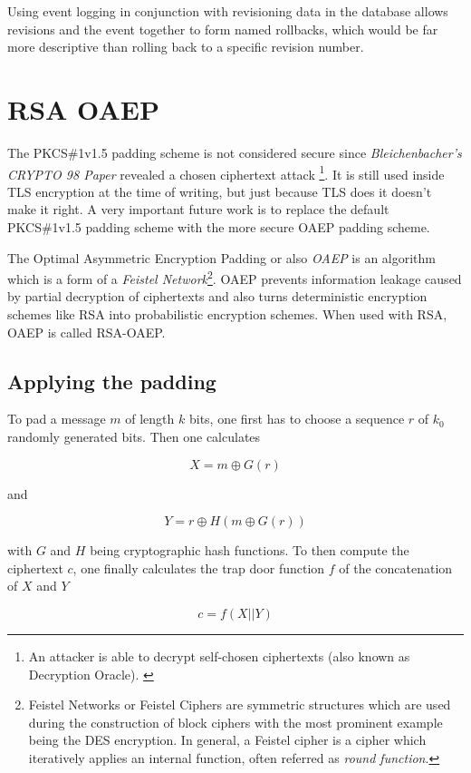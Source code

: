 Using event logging in conjunction with revisioning data in the database allows
revisions and the event together to form named rollbacks, which would be far
more descriptive than rolling back to a specific revision number.

\section{RSA OAEP}

The PKCS\#1v1.5 padding scheme is not considered secure since
\textit{Bleichenbacher's CRYPTO 98 Paper} \cite{rsabulletin}
revealed a chosen ciphertext attack \footnote{
  An attacker is able to decrypt self-chosen ciphertexts (also
  known as Decryption Oracle). \cite[p. 70]{baumann2014kryptographische}
}.
It is still used inside TLS encryption at the time of writing,
but just because TLS does it doesn't make it right. A very important
future work is to replace the default PKCS\#1v1.5 padding scheme with
the more secure OAEP padding scheme.

The Optimal Asymmetric Encryption Padding or also \textit{OAEP}
is an algorithm which is a form of a \textit{Feistel Network}\footnote{
  Feistel Networks or Feistel Ciphers are symmetric structures which are used
  during the construction of block ciphers with the most prominent example
  being the DES encryption. In general, a Feistel cipher is a cipher which
  iteratively applies an internal function, often referred as \textit{round function}.
}. OAEP prevents information leakage caused by partial decryption of 
ciphertexts and also turns deterministic encryption schemes like RSA into
probabilistic encryption schemes. When used with RSA, OAEP is called
RSA-OAEP.

\subsection{Applying the padding}

To pad a message $m$ of length $k$ bits, one first has to choose a sequence
$r$ of $k_0$ randomly generated bits. Then one calculates

$$X = m \oplus G(r)$$

and

$$Y = r \oplus H(m \oplus G(r))$$

with $G$ and $H$ being cryptographic hash functions. To then compute the
ciphertext $c$, one finally calculates the trap door function $f$ of the
concatenation of $X$ and $Y$

$$c = f(X || Y)$$

